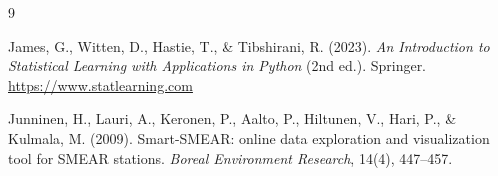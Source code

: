 \documentclass[11pt, a4paper]{article}
\begin{document}
\begin{thebibliography}{9}

James, G., Witten, D., Hastie, T., \& Tibshirani, R. (2023).
\textit{An Introduction to Statistical Learning with Applications in Python} (2nd ed.).
Springer. \url{https://www.statlearning.com}

Junninen, H., Lauri, A., Keronen, P., Aalto, P., Hiltunen, V., Hari, P., \& Kulmala, M. (2009).
Smart-SMEAR: online data exploration and visualization tool for SMEAR stations.
\textit{Boreal Environment Research}, 14(4), 447--457.

\end{thebibliography}
\end{document}
